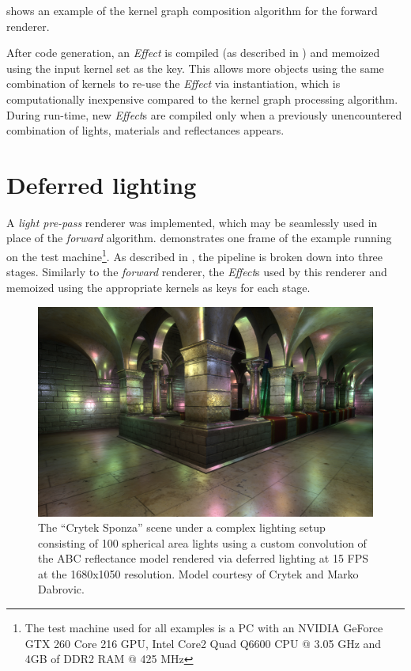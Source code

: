  shows an example of the kernel graph composition algorithm for the forward renderer.

After code generation, an \emph{Effect} is compiled (as described in ) and memoized using the input kernel set as the key. This allows more objects using the same combination of kernels to re-use the \emph{Effect} via instantiation, which is computationally inexpensive compared to the kernel graph processing algorithm. During run-time, new \emph{Effect}s are compiled only when a previously unencountered combination of lights, materials and reflectances appears.

\clearpage
\section{Deferred lighting}
\label{sec:DeferredLightingExample}

A \emph{light pre-pass} renderer was implemented, which may be seamlessly used in place of the \emph{forward} algorithm.  demonstrates one frame of the example running on the test machine\footnote{The test machine used for all examples is a PC with an NVIDIA GeForce GTX 260 Core 216 GPU, Intel Core2 Quad Q6600 CPU @ 3.05 GHz and 4GB of DDR2 RAM @ 425 MHz}. As described in , the pipeline is broken down into three stages. Similarly to the \emph{forward} renderer, the \emph{Effect}s used by this renderer and memoized using the appropriate kernels as keys for each stage.

\begin{figure}[ht!]
  \centering
    \includegraphics[width=0.9\linewidth]{./Figures/lightPrePass/sponza.jpg}
    \caption[Light pre-pass rendering of Sponza]{The ``Crytek Sponza'' scene under a complex lighting setup consisting of 100 spherical area lights using a custom convolution of the ABC reflectance model rendered via deferred lighting at 15 FPS at the 1680x1050 resolution. Model courtesy of Crytek and Marko Dabrovic.}
  \label{fig:lightPrePassSponza}
\end{figure}

